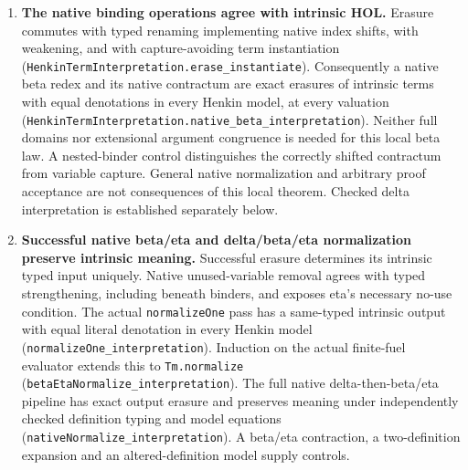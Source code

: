 \documentclass[11pt]{article}
\theoremstyle{definition}
\theoremstyle{remark}
\begin{document}
\begin{enumerate}
  (\nolinkurl{HenkinTermInterpretation.interpret_native}). Only symbols used
  by the term require plain lookup types; unrelated polymorphic declarations
  remain allowed. Under the stated annotation and lookup conditions,
  successful native type inference is equivalent to the existence of an
  intrinsic term of the corresponding type with exactly that native erasure.
  Higher-order terms at nonzero type depth and a mixed environment supply
  positive controls; a type-mismatched application has no interpretation.
  The partial erasure has no image for native type abstraction, type
  application, or prefix proposition quantification. This is a boundary of
  this constructorwise interpretation, not an impossibility of representing
  polymorphism by a richer interpretation.
\item \textbf{The native binding operations agree with intrinsic HOL.}
  Erasure commutes with typed renaming implementing native index shifts,
  with weakening, and with capture-avoiding term instantiation
  (\nolinkurl{HenkinTermInterpretation.erase_instantiate}). Consequently a
  native beta redex and its native contractum are exact erasures of intrinsic
  terms with equal denotations in every Henkin model, at every valuation
  (\nolinkurl{HenkinTermInterpretation.native_beta_interpretation}). Neither
  full domains nor extensional argument congruence is needed for this local
  beta law. A nested-binder control distinguishes the correctly shifted
  contractum from variable capture. General native normalization and arbitrary
  proof acceptance are not consequences of this local theorem. Checked delta
  interpretation is established separately below.
\item \textbf{Successful native beta/eta and delta/beta/eta normalization
  preserve intrinsic meaning.} Successful erasure determines its intrinsic
  typed input uniquely. Native unused-variable removal agrees with typed
  strengthening, including beneath binders, and exposes eta's necessary
  no-use condition. The actual \nolinkurl{normalizeOne} pass has a
  same-typed intrinsic output with equal literal denotation in every Henkin
  model (\nolinkurl{normalizeOne_interpretation}). Induction on the actual
  finite-fuel evaluator extends this to \nolinkurl{Tm.normalize}
  (\nolinkurl{betaEtaNormalize_interpretation}). The full native
  delta-then-beta/eta pipeline has exact output erasure and preserves meaning
  under independently checked definition typing and model equations
  (\nolinkurl{nativeNormalize_interpretation}). A beta/eta contraction, a
  two-definition expansion and an altered-definition model supply controls.

\end{enumerate}
\end{document}
